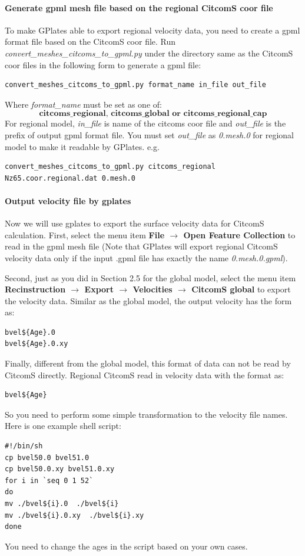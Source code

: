 \documentclass[letterpaper,12pt]{article}
\newcommand{\gp}[1]{\textbf{#1}}
\begin{document}
\paragraph{Generate gpml mesh file based on the regional CitcomS coor file}
To make GPlates able to export regional velocity data, you need to create a gpml format file based on the CitcomS coor file. Run \textit{convert\_meshes\_citcoms\_to\_gpml.py} under the directory same as the CitcomS coor files in the following form to generate a gpml file:
\begin{verbatim}
convert_meshes_citcoms_to_gpml.py format_name in_file out_file
\end{verbatim}
Where \textit{format\_name} must be set as one of:  \[\textbf{citcoms\_regional, citcoms\_global or citcoms\_regional\_cap}\]
For regional model, \textit{in\_file} is name of the citcoms coor file and \textit{out\_file} is the prefix of output gpml format file. You must set \textit{out\_file} as \emph{0.mesh.0} for regional model to make it readable by GPlates. e.g.
\begin{verbatim}
convert_meshes_citcoms_to_gpml.py citcoms_regional Nz65.coor.regional.dat 0.mesh.0
\end{verbatim}

\paragraph{Output velocity file by gplates}
Now we will use gplates to export the surface velocity data for CitcomS calculation.
First, select the menu item \gp{File $\rightarrow$ Open Feature Collection} to read in the gpml mesh file (Note that GPlates will export regional CitcomS velocity data only if the input .gpml file has exactly the name \emph{0.mesh.0.gpml}).

Second, just as you did in Section 2.5 for the global model, select the menu item \gp{Recinstruction $\rightarrow$ Export $\rightarrow$ Velocities $\rightarrow$ CitcomS global} to export the velocity data. Similar as the global model, the output velocity has the form as:
\begin{verbatim}
bvel${Age}.0
bvel${Age}.0.xy
\end{verbatim}
Finally, different from the global model, this format of data can not be read by CitcomS directly. Regional CitcomS read in velocity data with the format as:
\begin{verbatim}
bvel${Age}
\end{verbatim}
So you need to perform some simple transformation to the velocity file names. Here is one example shell script:
\begin{verbatim}
#!/bin/sh
cp bvel50.0 bvel51.0
cp bvel50.0.xy bvel51.0.xy
for i in `seq 0 1 52`
do
mv ./bvel${i}.0  ./bvel${i}
mv ./bvel${i}.0.xy  ./bvel${i}.xy
done
\end{verbatim}
You need to change the ages in the script based on your own cases.
\end{document}
